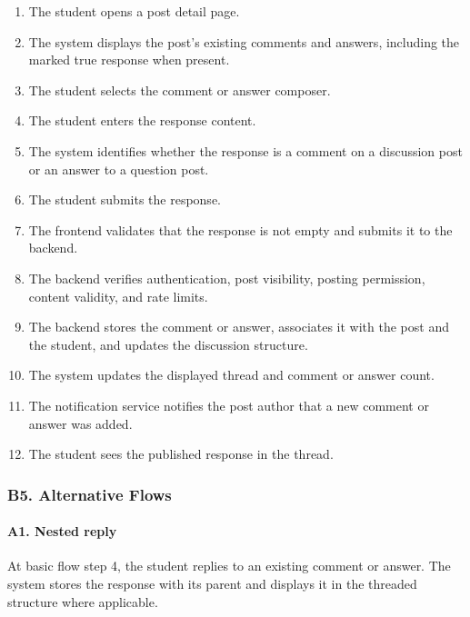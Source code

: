 \documentclass[12pt]{article}
\begin{document}
\begin{enumerate}
\item The student opens a post detail page.
\item The system displays the post's existing comments and answers, including the marked true response when present.
\item The student selects the comment or answer composer.
\item The student enters the response content.
\item The system identifies whether the response is a comment on a discussion post or an answer to a question post.
\item The student submits the response.
\item The frontend validates that the response is not empty and submits it to the backend.
\item The backend verifies authentication, post visibility, posting permission, content validity, and rate limits.
\item The backend stores the comment or answer, associates it with the post and the student, and updates the discussion structure.
\item The system updates the displayed thread and comment or answer count.
\item The notification service notifies the post author that a new comment or answer was added.
\item The student sees the published response in the thread.
\end{enumerate}
\par\medskip

\hypertarget{sec:b5-alternative-flows}{}
\subsubsection*{B5. Alternative Flows}
\par\medskip

\hypertarget{sec:a1-nested-reply}{}
\paragraph*{A1. Nested reply}
\par\medskip

At basic flow step 4, the student replies to an existing comment or answer. The system stores the response with its parent and displays it in the threaded structure where applicable.
\par\medskip
\end{document}
